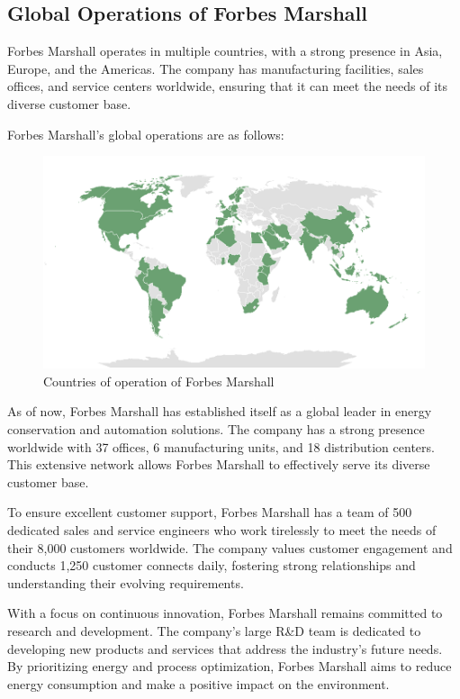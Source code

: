 \subsection{Global Operations of Forbes Marshall}
Forbes Marshall operates in multiple countries, with a strong presence in Asia, Europe, and the Americas. The company has manufacturing facilities, sales offices, and service centers worldwide, ensuring that it can meet the needs of its diverse customer base.

Forbes Marshall's global operations are as follows:

\begin{figure}[h!]
    \centering
    \includegraphics[width=0.8\linewidth]{figs/world_operations.png}
    \caption{Countries of operation of Forbes Marshall}
    \label{fig:world_operations}
\end{figure}

As of now, Forbes Marshall has established itself as a global leader in energy conservation and automation solutions. The company has a strong presence worldwide with 37 offices, 6 manufacturing units, and 18 distribution centers. This extensive network allows Forbes Marshall to effectively serve its diverse customer base.

To ensure excellent customer support, Forbes Marshall has a team of 500 dedicated sales and service engineers who work tirelessly to meet the needs of their 8,000 customers worldwide. The company values customer engagement and conducts 1,250 customer connects daily, fostering strong relationships and understanding their evolving requirements.

With a focus on continuous innovation, Forbes Marshall remains committed to research and development. The company's large R\&D team is dedicated to developing new products and services that address the industry's future needs. By prioritizing energy and process optimization, Forbes Marshall aims to reduce energy consumption and make a positive impact on the environment.

